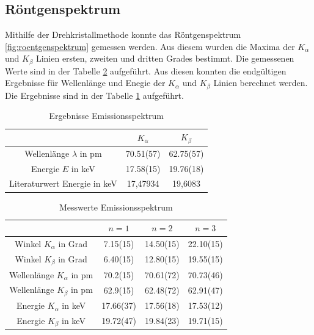 \documentclass[11pt, a4paper]{article}
\begin{document}
    \subsection{Röntgenspektrum} \FloatBarrier

    Mithilfe der Drehkristallmethode konnte das Röntgenspektrum \ref{fig:roentgenspektrum} gemessen werden. Aus diesem wurden die Maxima der $K_{\alpha}$ und $K_{\beta}$ Linien ersten, zweiten und dritten Grades bestimmt. Die gemessenen Werte sind in der Tabelle \ref{tab:roentgenspektrum} aufgeführt. Aus diesen konnten die endgültigen Ergebnisse für Wellenlänge und Enegie der $K_{\alpha}$ und $K_{\beta}$ Linien berechnet werden. Die Ergebnisse sind in der Tabelle \ref{tab:linienerg} aufgeführt.

    \begin{table}
        \centering
        \caption{Ergebnisse Emissionsspektrum}
        \label{tab:linienerg}
        \begin{tabular}{c|c|c}
            & $K_{\alpha}$ & $K_{\beta}$ \\
            \hline
            Wellenlänge $\lambda$ in pm & 70.51(57) & 62.75(57) \\
            Energie $E$ in keV & 17.58(15) & 19.76(18) \\
            Literaturwert Energie \cite{lin} in keV & 17,47934 & 19,6083
        \end{tabular}
    \end{table}

    \begin{table}[h]
        \centering
        \label{tab:roentgenspektrum}
        \begin{tabular}{c|c|c|c}
        & \textbf{$n = 1$} & \textbf{$n = 2$} & \textbf{$n = 3$} \\ 
        \hline
        Winkel $K_{\alpha}$ in Grad & 7.15(15) & 14.50(15) & 22.10(15)\\ 
        Winkel $K_{\beta}$ in Grad & 6.40(15) & 12.80(15) & 19.55(15)\\ 
        Wellenlänge $K_{\alpha}$ in pm & 70.2(15) & 70.61(72) & 70.73(46) \\ 
        Wellenlänge $K_{\beta}$ in pm & 62.9(15) & 62.48(72) & 62.91(47)\\ 
        Energie $K_{\alpha}$ in keV & 17.66(37) & 17.56(18) & 17.53(12)\\ 
        Energie $K_{\beta}$ in keV & 19.72(47) & 19.84(23) & 19.71(15)\\ 
        \end{tabular}
        \caption{Messwerte Emissionsspektrum}
    \end{table}
\end{document}
